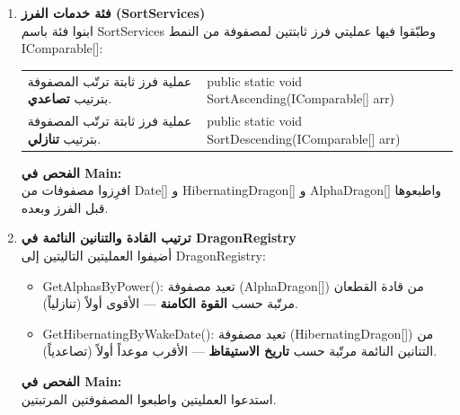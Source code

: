 \documentclass[14pt]{extarticle}
\begin{document}
\begin{enumerate}[resume, label=\textbf{تمرين \arabic*:}, wide=0pt, leftmargin=*, itemsep=2.2em]
    \item \textbf{فئة خدمات الفرز (\textenglish{SortServices})} \\
    ابنوا فئة باسم \textenglish{SortServices} وطبّقوا فيها عمليتي فرز ثابتتين لمصفوفة من النمط \textenglish{IComparable[]}:

    {\centering
    \renewcommand{\arraystretch}{1.2}
    \small
    \begin{tabular}{|>{\raggedleft\arraybackslash}p{}|>{\raggedright\arraybackslash}p{}|}
    \hline
    \multicolumn{2}{|c|}{\textbf{الفئة: \textenglish{SortServices}}} \\
    \hline
    عملية فرز ثابتة ترتّب المصفوفة بترتيب \textbf{تصاعدي}. & \textenglish{public static void SortAscending(IComparable[] arr)} \\
    \hline
    عملية فرز ثابتة ترتّب المصفوفة بترتيب \textbf{تنازلي}. & \textenglish{public static void SortDescending(IComparable[] arr)} \\
    \hline
    \end{tabular}
    \par} %

    \vspace{2em}
    \noindent \textbf{الفحص في \textenglish{Main}:} \\
    افرِزوا مصفوفات من \textenglish{Date[]} و \textenglish{HibernatingDragon[]} و \textenglish{AlphaDragon[]} واطبعوها قبل الفرز وبعده.

    \item \textbf{ترتيب القادة والتنانين النائمة في \textenglish{DragonRegistry}} \\
    أضيفوا العمليتين التاليتين إلى \textenglish{DragonRegistry}:
    \begin{itemize}
        \item \textenglish{GetAlphasByPower()}: تعيد مصفوفة (\textenglish{AlphaDragon[]}) من قادة القطعان مرتّبة حسب \textbf{القوة الكامنة} — الأقوى أولاً (تنازلياً).
        \item \textenglish{GetHibernatingByWakeDate()}: تعيد مصفوفة (\textenglish{HibernatingDragon[]}) من التنانين النائمة مرتّبة حسب \textbf{تاريخ الاستيقاظ} — الأقرب موعداً أولاً (تصاعدياً).
    \end{itemize}
    \textbf{الفحص في \textenglish{Main}:} \\
    استدعوا العمليتين واطبعوا المصفوفتين المرتبتين.


\end{enumerate}
\end{document}
